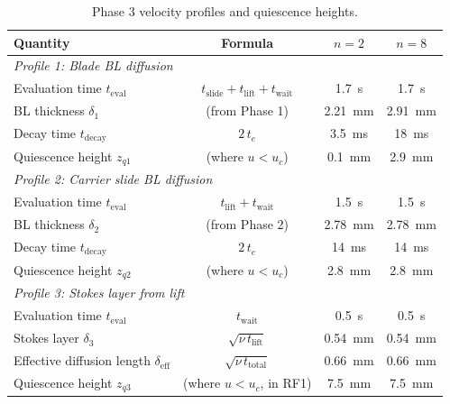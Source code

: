 \documentclass[11pt,a4paper]{article}
\begin{document}
\begin{table}[H]
\centering
\caption{Phase 3 velocity profiles and quiescence heights.}
\label{tab:lift_profiles}
\begin{tabular}{lccc}
\toprule
Quantity & Formula & $n = 2$ & $n = 8$ \\
\midrule
\multicolumn{4}{l}{\textit{Profile 1: Blade BL diffusion}} \\
Evaluation time $t_\mathrm{eval}$ & $t_\mathrm{slide} + t_\mathrm{lift} + t_\mathrm{wait}$
  & \SI{1.7}{s} & \SI{1.7}{s} \\
BL thickness $\delta_1$ & (from Phase 1) & \SI{2.21}{mm} & \SI{2.91}{mm} \\
Decay time $t_\mathrm{decay}$ & $2\,t_e$ & \SI{3.5}{ms} & \SI{18}{ms} \\
Quiescence height $z_{q1}$ & (where $u < u_c$) & \SI{0.1}{mm} & \SI{2.9}{mm} \\
\midrule
\multicolumn{4}{l}{\textit{Profile 2: Carrier slide BL diffusion}} \\
Evaluation time $t_\mathrm{eval}$ & $t_\mathrm{lift} + t_\mathrm{wait}$
  & \SI{1.5}{s} & \SI{1.5}{s} \\
BL thickness $\delta_2$ & (from Phase 2) & \SI{2.78}{mm} & \SI{2.78}{mm} \\
Decay time $t_\mathrm{decay}$ & $2\,t_e$ & \SI{14}{ms} & \SI{14}{ms} \\
Quiescence height $z_{q2}$ & (where $u < u_c$) & \SI{2.8}{mm} & \SI{2.8}{mm} \\
\midrule
\multicolumn{4}{l}{\textit{Profile 3: Stokes layer from lift}} \\
Evaluation time $t_\mathrm{eval}$ & $t_\mathrm{wait}$
  & \SI{0.5}{s} & \SI{0.5}{s} \\
Stokes layer $\delta_3$ & $\sqrt{\nu\,t_\mathrm{lift}}$
  & \SI{0.54}{mm} & \SI{0.54}{mm} \\
Effective diffusion length $\delta_\mathrm{eff}$ & $\sqrt{\nu\,t_\mathrm{total}}$
  & \SI{0.66}{mm} & \SI{0.66}{mm} \\
Quiescence height $z_{q3}$ & (where $u < u_c$, in RF1)
  & \SI{7.5}{mm} & \SI{7.5}{mm} \\
\bottomrule
\end{tabular}
\end{table}
\end{document}
